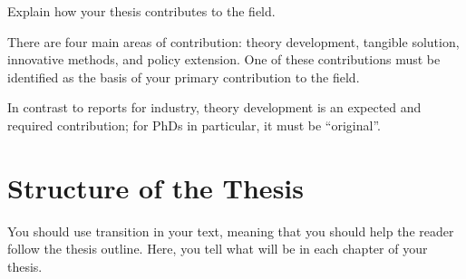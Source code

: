 Explain how your thesis contributes to the field.

There are four main areas of contribution: theory development, tangible solution, innovative methods, and policy extension. One of these contributions must be identified as the basis of your primary contribution to the field.

In contrast to reports for industry, theory development is an expected and required contribution; for PhDs in particular, it must be ``original''.

\section{Structure of the Thesis}
\label{section:structure} 

You should use transition in your text, meaning that you should help the reader follow the thesis outline. Here, you tell what will be in each chapter of your thesis. 

